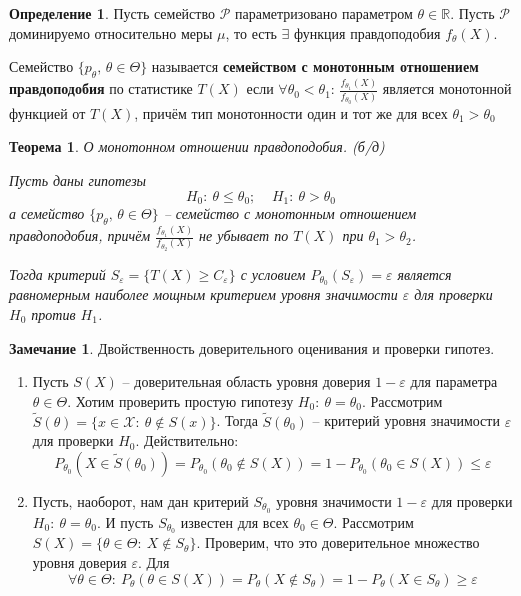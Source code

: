 \documentclass[a4paper,12pt]{article}
\renewcommand{\leq}{\ensuremath{\leqslant}}
\renewcommand{\geq}{\ensuremath{\geqslant}}
\theoremstyle{plain}
\newtheorem{theorem}{Теорема}[section]
\theoremstyle{definition}
\newtheorem{definition}{Определение}[section]
\newtheorem*{note}{Замечание}
\theoremstyle{remark}
\begin{document}
\begin{definition}
  Пусть семейство $\mathcal{P}$ параметризовано параметром $\theta \in \mathbb{R}$. Пусть $\mathcal{P}$ доминируемо относительно меры $\mu$, то есть $\exists$ функция правдоподобия $f_\theta(X)$.

  Семейство $\{p_\theta,\, \theta \in \Theta\}$ называется \textbf{семейством с монотонным отношением правдоподобия} по статистике $T(X)$ если $\forall \theta_0 < \theta_1$: $\frac{f_{\theta_1}(X)}{f_{\theta_0}(X)}$ является монотонной функцией от $T(X)$, причём тип монотонности один и тот же для всех $\theta_1 > \theta_0$ 
\end{definition}

\begin{theorem}
  О монотонном отношении правдоподобия. (б/д)

  Пусть даны гипотезы 
  \[
    H_0 :\: \theta \leq \theta_0;\;\;\;\; H_1 :\: \theta > \theta_0
  \]
  а семейство $\{p_\theta,\, \theta \in \Theta\}$ -- семейство с монотонным отношением правдоподобия, причём $\frac{f_{\theta_1}(X)}{f_{\theta_2}(X)}$ не убывает по $T(X)$ при $\theta_1 > \theta_2$.

  Тогда критерий $S_\varepsilon = \{T(X) \geq C_\varepsilon\}$ с условием $P_{\theta_0}(S_\varepsilon) = \varepsilon$ является равномерным наиболее мощным критерием уровня значимости $\varepsilon$ для проверки $H_0$ против $H_1$.
\end{theorem}

\begin{note}
  Двойственность доверительного оценивания и проверки гипотез.

  \begin{enumerate}
    \item Пусть $S(X)$ -- доверительная область уровня доверия $1 - \varepsilon$ для параметра $\theta \in \Theta$. Хотим проверить простую гипотезу $H_0 :\: \theta = \theta_0$. Рассмотрим $\tilde{S}(\theta) = \{x \in \mathcal{X} :\: \theta \not\in S(x)\}$. Тогда $\tilde{S}(\theta_0)$ -- критерий уровня значимости $\varepsilon$ для проверки $H_0$. Действительно:
    \[
      P_{\theta_0}(X \in \tilde{S}(\theta_0)) = P_{\theta_0}(\theta_0 \not\in S(X)) = 1 - P_{\theta_0}(\theta_0 \in S(X)) \leq \varepsilon
    \]
    \item Пусть, наоборот, нам дан критерий $S_{\theta_0}$ уровня значимости $1 - \varepsilon$ для проверки $H_0 :\: \theta = \theta_0$. И пусть $S_{\theta_0}$ известен для всех $\theta_0 \in \Theta$. Рассмотрим $S(X) = \{\theta \in \Theta :\: X \not\in S_{\theta}\}$. Проверим, что это доверительное множество уровня доверия $\varepsilon$. Для
    \[
      \forall \theta \in \Theta :\: P_\theta(\theta \in S(X)) = P_\theta(X \not\in S_\theta) = 1 - P_\theta(X \in S_\theta) \geq \varepsilon
    \]
  \end{enumerate}
\end{note}
\end{document}
